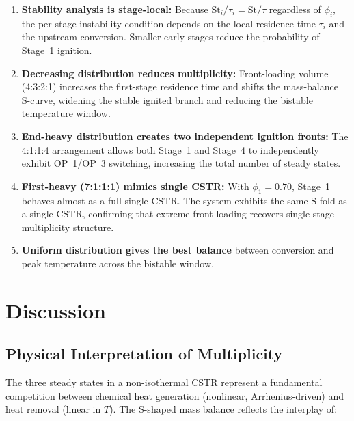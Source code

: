 \documentclass[11pt,a4paper]{article}
\newcommand{\St}{\mathrm{St}}
\begin{document}
\begin{enumerate}[leftmargin=1.6em,itemsep=2pt]
  \item \textbf{Stability analysis is stage-local:} Because
        $\St_i/\tau_i = \St/\tau$ regardless of $\phi_i$,
        the per-stage instability condition depends on the local residence time
        $\tau_i$ and the upstream conversion.  Smaller early stages reduce
        the probability of Stage~1 ignition.

  \item \textbf{Decreasing distribution reduces multiplicity:}
        Front-loading volume (4:3:2:1) increases the first-stage residence time
        and shifts the mass-balance S-curve, widening the stable ignited branch
        and reducing the bistable temperature window.

  \item \textbf{End-heavy distribution creates two independent ignition fronts:}
        The 4:1:1:4 arrangement allows both Stage~1 and Stage~4 to independently
        exhibit OP~1/OP~3 switching, increasing the total number of steady states.

  \item \textbf{First-heavy (7:1:1:1) mimics single CSTR:}
        With $\phi_1=0.70$, Stage~1 behaves almost as a full single CSTR.
        The system exhibits the same S-fold as a single CSTR, confirming
        that extreme front-loading recovers single-stage multiplicity structure.

  \item \textbf{Uniform distribution gives the best balance} between
        conversion and peak temperature across the bistable window.
\end{enumerate}

\section{Discussion}
\label{sec:discussion}

\subsection{Physical Interpretation of Multiplicity}

The three steady states in a non-isothermal CSTR represent a fundamental
competition between chemical heat generation (nonlinear, Arrhenius-driven)
and heat removal (linear in $T$).  The S-shaped mass balance reflects the
interplay of:
\end{document}
